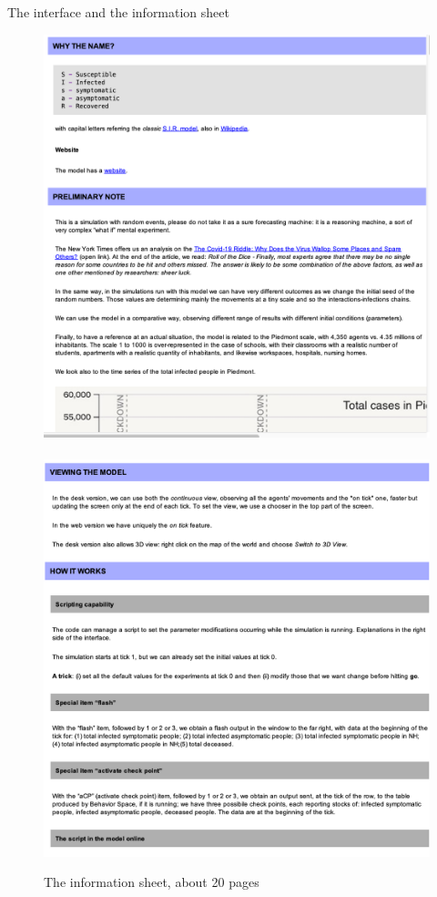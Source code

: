 \documentclass[8pt]{beamer}
\begin{document}
\begin{frame}{The interface and the information sheet}

\begin{figure}[H]
\center
\includegraphics[scale=0.23]{info1.png}~~~\includegraphics[scale=0.23]{info2.png}

\caption{The information sheet, about  20 pages} 
\label{interface}
\end{figure}

\end{frame}
\end{document}
